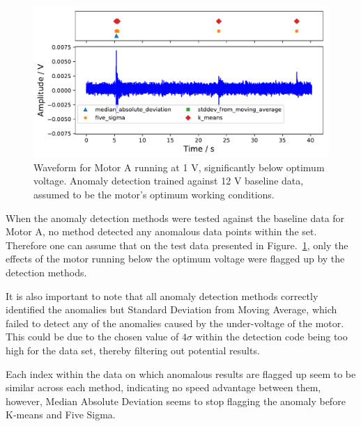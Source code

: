 \begin{figure}[t]
    \includegraphics[width=1.0\textwidth]{fig/large_1V_nowater_large_12V.pdf}
    \caption[Undervoltage of Large Motor]{Waveform for Motor A running at 1 V, significantly below optimum voltage. Anomaly detection trained against 12 V baseline data, assumed to be the motor's optimum working conditions.}
    \label{fig:largemotor_1V}
\end{figure}

When the anomaly detection methods were tested against the baseline data for Motor A, no method detected any anomalous data points within the set. Therefore one can assume that on the test data presented in Figure.~\ref{fig:largemotor_1V}, only the effects of the motor running below the optimum voltage were flagged up by the detection methods. 

It is also important to note that all anomaly detection methods correctly identified the anomalies but Standard Deviation from Moving Average, which failed to detect any of the anomalies caused by the under-voltage of the motor. This could be due to the chosen value of $4\sigma$ within the detection code being too high for the data set, thereby filtering out potential results.

Each index within the data on which anomalous results are flagged up seem to be similar across each method, indicating no speed advantage between them, however, Median Absolute Deviation seems to stop flagging the anomaly before K-means and Five Sigma. %

